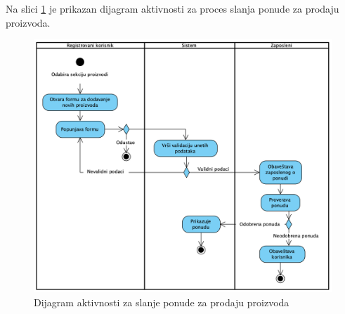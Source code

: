 \documentclass[a4paper]{article}
\begin{document}
Na slici \ref{dakt_slanje_ponude_za_prodaju} je prikazan dijagram aktivnosti za proces slanja ponude za prodaju proizvoda.
\begin{figure}[h!]
    \centering
    \includegraphics[scale=0.5]{images/dakt_slanje_ponude_za_prodaju.png}
    \caption{Dijagram aktivnosti za slanje ponude za prodaju proizvoda}
    \label{dakt_slanje_ponude_za_prodaju}
\end{figure}
\end{document}
